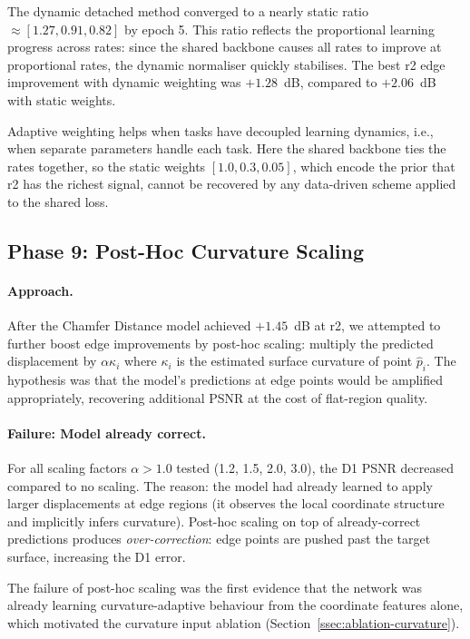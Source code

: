 The dynamic detached method converged to a nearly static ratio
$\approx [1.27, 0.91, 0.82]$ by epoch 5.
This ratio reflects the proportional learning progress across rates: since the
shared backbone causes all rates to improve at proportional rates, the dynamic
normaliser quickly stabilises.
The best r2 edge improvement with dynamic weighting was $+1.28$~dB, compared
to $+2.06$~dB with static weights.

Adaptive weighting helps when tasks have decoupled learning dynamics, i.e.,
when separate parameters handle each task.
Here the shared backbone ties the rates together, so the static weights
$[1.0, 0.3, 0.05]$, which encode the prior that r2 has the richest signal,
cannot be recovered by any data-driven scheme applied to the shared loss.

\subsection{Phase 9: Post-Hoc Curvature Scaling}

\paragraph{Approach.}
After the Chamfer Distance model achieved $+1.45$~dB at r2, we attempted to
further boost edge improvements by post-hoc scaling: multiply the predicted
displacement by $\alpha \kappa_i$ where $\kappa_i$ is the estimated surface
curvature of point $\hat{p}_i$.
The hypothesis was that the model's predictions at edge points would be amplified
appropriately, recovering additional PSNR at the cost of flat-region quality.

\paragraph{Failure: Model already correct.}
For all scaling factors $\alpha > 1.0$ tested (1.2, 1.5, 2.0, 3.0), the D1
PSNR decreased compared to no scaling.
The reason: the model had already learned to apply larger displacements at
edge regions (it observes the local coordinate structure and implicitly infers
curvature).
Post-hoc scaling on top of already-correct predictions produces
\emph{over-correction}: edge points are pushed past the target surface,
increasing the D1 error.

The failure of post-hoc scaling was the first evidence that the network was
already learning curvature-adaptive behaviour from the coordinate features
alone, which motivated the curvature input ablation (Section~\ref{ssec:ablation-curvature}).

